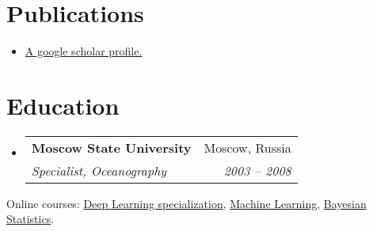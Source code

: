 \documentclass[letterpaper,11pt]{article}
\makeatletter
\newcommand{\resumePubItem}[2]{
  \item\small{
    \textbf{#1}{ #2 \vspace{-2pt}}
  }
}
\newcommand{\resumeSubheading}[4]{
  \vspace{-1pt}\item
    \begin{tabular*}{0.97\textwidth}[t]{l@{\extracolsep{\fill}}r}
      \textbf{#1} & #2 \\
      \textit{\small#3} & \textit{\small #4} \\
    \end{tabular*}\vspace{-5pt}
}
\newcommand{\resumeSubHeadingListStart}{\begin{itemize}[leftmargin=*]}
\newcommand{\resumeSubHeadingListEnd}{\end{itemize}}
\makeatother
\begin{document}
\section{Publications}
  \resumeSubHeadingListStart
    \resumePubItem{}
      {\href{https://scholar.google.com/citations?hl=en&user=72diaAiPvoYC&view_op=list_works&sortby=pubdate}{A google scholar profile.}}
  \resumeSubHeadingListEnd


\section{Education}
  \resumeSubHeadingListStart
    \resumeSubheading
      {Moscow State University}{Moscow, Russia}
      {Specialist, Oceanography}{2003 -- 2008}
  \resumeSubHeadingListEnd
  
  Online courses:
  {\href{https://coursera.org/share/738f07c3514e74b4b4a2ec4c7df53d11}{Deep Learning specialization},
   \href{https://coursera.org/share/a7e216966ca1e16fd6c58b7d58cb0806}{Machine Learning},
   \href{https://coursera.org/share/2a20ba63d42f5a2557db34e3e9837382}{Bayesian Statistics}.}



\end{document}
